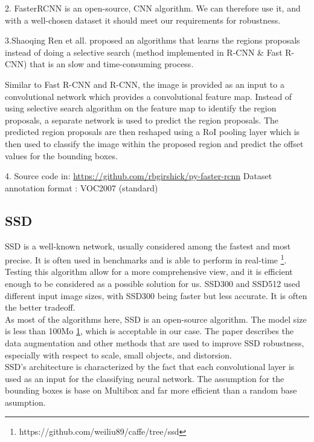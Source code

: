 \documentclass[10pt]{article}
\begin{document}
2. FasterRCNN is an open-source, CNN algorithm. We can therefore use it, and with a well-chosen dataset it should meet our requirements for robustness.

3.Shaoqing Ren et all.\cite{ren2015faster} proposed an algorithms that learns the regions proposals instead of doing a selective search (method implemented in R-CNN \& Fast R-CNN) that is an slow and time-consuming process.

Similar to Fast R-CNN and R-CNN, the image is provided as an input to a convolutional network which provides a convolutional feature map. Instead of using selective search algorithm on the feature map to identify the region proposals, a separate network is used to predict the region proposals. The predicted region proposals are then reshaped using a RoI pooling layer which is then used to classify the image within the proposed region and predict the offset values for the bounding boxes.

4. Source code in: \url{https://github.com/rbgirshick/py-faster-rcnn}
Dataset annotation format : VOC2007 (standard)



\subsection{SSD}
SSD \cite{liu2016ssd} is a well-known network, usually considered among the fastest and most precise. It is often used in benchmarks and is able to perform in real-time \footnote{\label{gitssd}https://github.com/weiliu89/caffe/tree/ssd}. Testing this algorithm allow for a more comprehensive view, and it is efficient enough to be considered as a possible solution for us. SSD300 and SSD512 used different input image sizes, with SSD300 being faster but less accurate. It is often the better tradeoff.\\

As most of the algorithms here, SSD is an open-source algorithm. The model size is less than 100Mo \ref{gitssd}, which is acceptable in our case. The paper describes the data augmentation and other methods that are used to improve SSD robustness, especially with respect to scale, small objects, and distorsion. \\

SSD's architecture is characterized by the fact that each convolutional layer is used as an input for the classifying neural network. The assumption for the bounding boxes is base on Multibox \cite{szegedy2014scalable} and far more efficient than a random base asumption.
\end{document}
